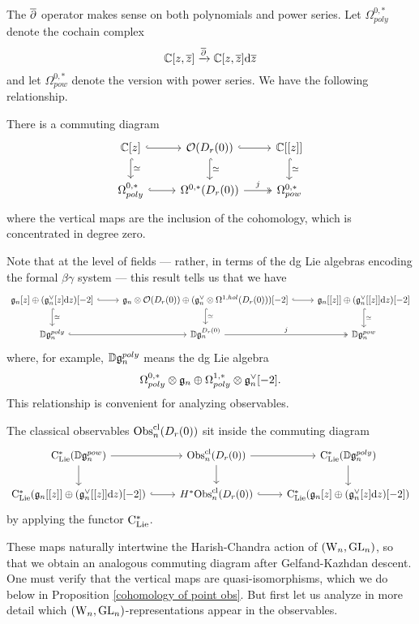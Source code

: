 The $\overline{\partial}$ operator makes sense on both polynomials and power series.
Let $\Omega^{0,*}_{poly}$ denote the cochain complex
\[
\mathbb C[z,\overline{z}] \xrightarrow{\overline{\partial}} \mathbb C[z,\overline{z}]{\rm d}\overline{z}
\]
and let $\Omega^{0,*}_{pow}$ denote the version with power series.
We have the following relationship.

\begin{lemma}
There is a commuting diagram
\[
\begin{tikzcd}
\CC[z] \ar[hook]{r} \ar[hook]{d}{\simeq} & \cO(D_r(0)) \ar[hook]{r} \ar[hook]{d}{\simeq} & \CC[[z]] \ar[hook]{d}{\simeq} \\
\Omega^{0,*}_{poly} \ar[hook]{r} & \Omega^{0,*}(D_r(0)) \ar[two heads]{r}{j} & \Omega^{0,*}_{pow}
\end{tikzcd}
\]
where the vertical maps are the inclusion of the cohomology, which is concentrated in degree zero.
\end{lemma}

Note that at the level of fields --- rather, in terms of the dg Lie algebras encoding the formal $\beta\gamma$ system --- this result tells us that we have
\[
\begin{tikzcd}
\fgn[z] \oplus (\fgn^\vee[z]\d z)[-2] \ar[hook]{r} \ar[hook]{d}{\simeq} & \fgn \otimes \cO(D_r(0)) \oplus (\fgn^\vee \otimes \Omega^{1,hol}(D_r(0)))[-2]  \ar[hook]{r} \ar[hook]{d}{\simeq} & \fgn[[z]] \oplus (\fgn^\vee[[z]]\d z)[-2] \ar[hook]{d}{\simeq} \\
\DD\fgn^{poly} \ar[hook]{r} & \DD\fgn^{D_r(0)} \ar[two heads]{r}{j} & \DD\fgn^{pow}
\end{tikzcd}
\]
where, for example, $\mathbb D\mathfrak{g}_n^{poly}$ means the dg Lie algebra 
\[
\Omega^{0,*}_{poly} \otimes \mathfrak{g}_n \oplus \Omega^{1,*}_{poly} \otimes \mathfrak{g}_n^\vee[-2].
\]
This relationship is convenient for analyzing observables.

\begin{lemma}
The classical observables ${\rm Obs}^{\rm cl}_n(D_r(0))$ sit inside the commuting diagram
\[
\begin{tikzcd}
\clies(\DD\fgn^{pow}) \ar{r} \ar{d} & \Obs^\cl_n(D_r(0)) \ar{r} \ar{d} & \clies(\DD\fgn^{poly}) \ar{d}\\
\clies(\fgn[[z]] \oplus (\fgn^\vee[[z]]\d z)[-2]) \ar[hook]{r} & H^* \Obs^\cl_n(D_r(0))  \ar[hook]{r} & \clies(\fgn[z] \oplus (\fgn^\vee[z]\d z)[-2])
\end{tikzcd}
\]
by applying the functor ${\rm C}_{\rm Lie}^*$.
\end{lemma}

These maps naturally intertwine the Harish-Chandra action of $({{\rm W}_n},{\rm GL}_n)$, 
so that we obtain an analogous commuting diagram after Gelfand-Kazhdan descent.
One must verify that the vertical maps are quasi-isomorphisms, 
which we do below in Proposition \ref{cohomology of point obs}.
But first let us analyze in more detail which $({{\rm W}_n},{\rm GL}_n)$-representations appear in the observables.

